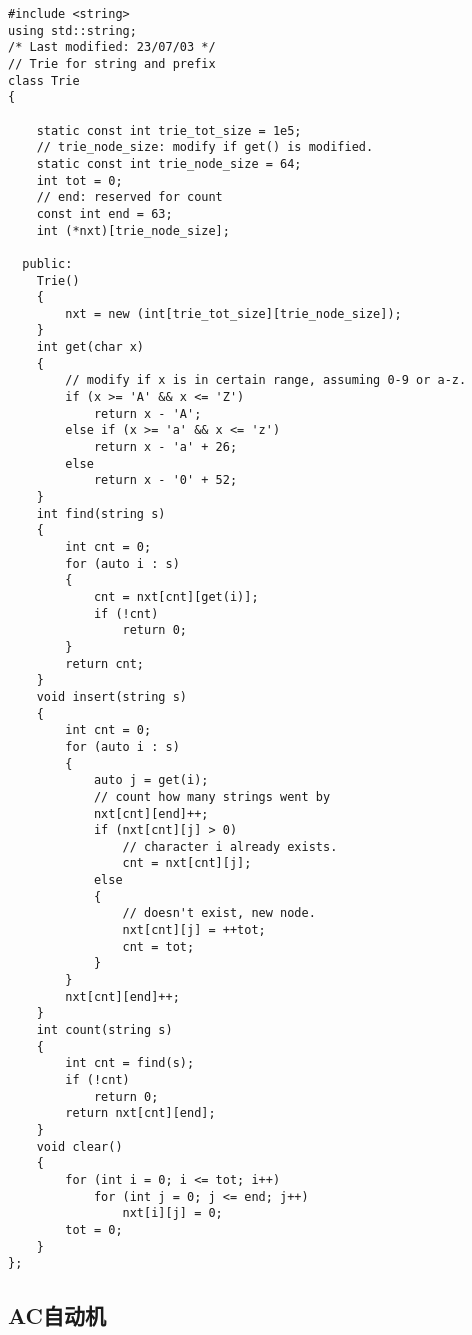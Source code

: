 \documentclass[]{article}
\begin{document}
\begin{verbatim}
#include <string>
using std::string;
/* Last modified: 23/07/03 */
// Trie for string and prefix
class Trie
{

    static const int trie_tot_size = 1e5;
    // trie_node_size: modify if get() is modified.
    static const int trie_node_size = 64;
    int tot = 0;
    // end: reserved for count
    const int end = 63;
    int (*nxt)[trie_node_size];

  public:
    Trie()
    {
        nxt = new (int[trie_tot_size][trie_node_size]);
    }
    int get(char x)
    {
        // modify if x is in certain range, assuming 0-9 or a-z.
        if (x >= 'A' && x <= 'Z')
            return x - 'A';
        else if (x >= 'a' && x <= 'z')
            return x - 'a' + 26;
        else
            return x - '0' + 52;
    }
    int find(string s)
    {
        int cnt = 0;
        for (auto i : s)
        {
            cnt = nxt[cnt][get(i)];
            if (!cnt)
                return 0;
        }
        return cnt;
    }
    void insert(string s)
    {
        int cnt = 0;
        for (auto i : s)
        {
            auto j = get(i);
            // count how many strings went by
            nxt[cnt][end]++;
            if (nxt[cnt][j] > 0)
                // character i already exists.
                cnt = nxt[cnt][j];
            else
            {
                // doesn't exist, new node.
                nxt[cnt][j] = ++tot;
                cnt = tot;
            }
        }
        nxt[cnt][end]++;
    }
    int count(string s)
    {
        int cnt = find(s);
        if (!cnt)
            return 0;
        return nxt[cnt][end];
    }
    void clear()
    {
        for (int i = 0; i <= tot; i++)
            for (int j = 0; j <= end; j++)
                nxt[i][j] = 0;
        tot = 0;
    }
};
\end{verbatim}

\hypertarget{acux81eaux52a8ux673a}{%
\subsection{AC自动机}\label{acux81eaux52a8ux673a}}
\end{document}
